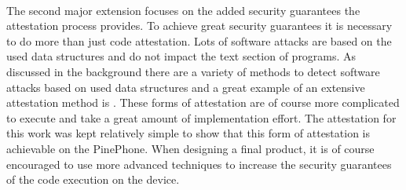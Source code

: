 \paragraph*{}
The second major extension focuses on the added security guarantees the attestation process provides. To achieve great security guarantees it is necessary to do more than just code attestation. Lots of software attacks are based on the used data structures and do not impact the text section of programs. As discussed in the background there are a variety of methods to detect software attacks based on used data structures and a great example of an extensive attestation method is \cite{MuhlbergJanTobias2016LaFT}. These forms of attestation are of course more complicated to execute and take a great amount of implementation effort. The attestation for this work was kept relatively simple to show that this form of attestation is achievable on the PinePhone. When designing a final product, it is of course encouraged to use more advanced techniques to increase the security guarantees of the code execution on the device.